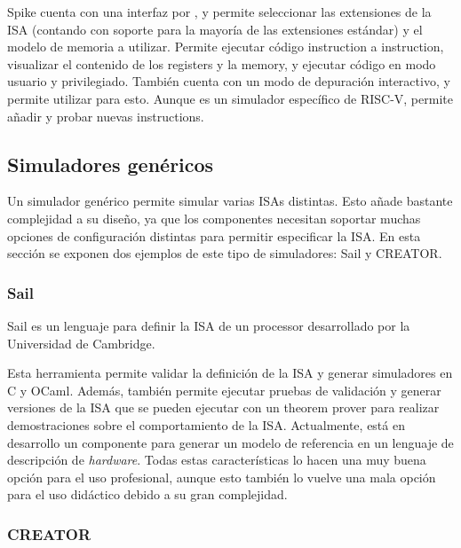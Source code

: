 Spike cuenta con una interfaz por , y
permite seleccionar las extensiones de la \gls{ISA} (contando con soporte para
la mayoría de las extensiones estándar) y el modelo de memoria a utilizar.
Permite ejecutar código \gls{instruction} a \gls{instruction}, visualizar el
contenido de los \glspl{register} y la \gls{memory}, y ejecutar código en modo
usuario y privilegiado. También cuenta con un modo de depuración interactivo, y
permite utilizar  para esto. Aunque es un simulador específico de
RISC-V, permite añadir y probar nuevas \glspl{instruction}.



\subsection{Simuladores genéricos}

Un simulador genérico permite simular varias \glspl{ISA} distintas. Esto añade
bastante complejidad a su diseño, ya que los componentes necesitan soportar
muchas opciones de configuración distintas para permitir especificar la
\gls{ISA}. En esta sección se exponen dos ejemplos de este tipo de simuladores:
Sail y CREATOR.

\subsubsection{Sail}

Sail \parencite{sail} es un lenguaje para definir la \gls{ISA} de un
\gls{processor} desarrollado por la Universidad de Cambridge.

Esta herramienta permite validar la definición de la \gls{ISA} y generar
simuladores en C y OCaml. Además, también permite ejecutar pruebas de validación
y generar versiones de la \gls{ISA} que se pueden ejecutar con un \gls{theorem
prover} para realizar demostraciones sobre el comportamiento de la \gls{ISA}.
Actualmente, está en desarrollo un componente para generar un modelo de
referencia en un lenguaje de descripción de \textit{hardware}. Todas estas
características lo hacen una muy buena opción para el uso profesional, aunque
esto también lo vuelve una mala opción para el uso didáctico debido a su gran
complejidad.

\subsubsection{CREATOR}

